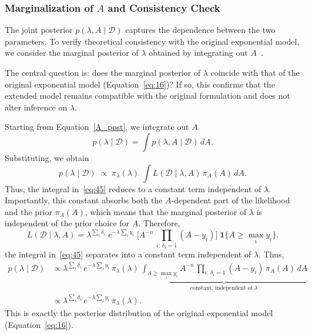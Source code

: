 \subsubsection{Marginalization of \texorpdfstring{$A$}{A} and Consistency Check}
\label{边际化章节}
The joint posterior $p(\lambda, A \mid \mathcal D)$ captures the dependence between the two parameters. To verify theoretical consistency with the original exponential model, we consider the marginal posterior of $\lambda$ obtained by integrating out $A$~\cite{gelman1995bayesian}.   

The central question is: does the marginal posterior of $\lambda$ coincide with that of the original exponential model (Equation~\ref{eq:16})? If so, this confirms that the extended model remains compatible with the original formulation and does not alter inference on $\lambda$.

Starting from Equation~\eqref{A_post}, we integrate out $A$~\cite{berger1999integrated}
\begin{equation}
    p(\lambda \mid \mathcal D)
= \int p(\lambda, A \mid \mathcal D)\,dA.
\end{equation}
Substituting, we obtain
\begin{equation}
    p(\lambda \mid \mathcal D)\;\propto\;\pi_\lambda(\lambda)\;\int L(\mathcal D \mid \lambda, A)\,\pi_A(A)\,dA.
    \label{eq:45}
\end{equation}
Thus, the integral in~\eqref{eq:45} reduces to a constant term independent of $\lambda$. 
Importantly, this constant absorbs both the $A$-dependent part of the likelihood and the prior $\pi_A(A)$, which means that the marginal posterior of $\lambda$ is independent of the prior choice for $A$. 
Therefore,
\begin{equation}
    L(\mathcal D \mid \lambda, A)
= \lambda^{\sum_i \delta_i}\;
e^{-\lambda \sum_i y_i}\;
\Bigg[
A^{-n}\,\prod_{i:\,\delta_i=1}(A-y_i)
\Bigg]\;\mathbf 1\{A \ge \max_i y_i\}.
\end{equation}
the integral in~\eqref{eq:45} separates into a constant term independent of $\lambda$. Thus,
\begin{align}
\label{eq:47}
p(\lambda \mid \mathcal{D})
&\propto \lambda^{\sum_i \delta_i}\,
e^{-\lambda \sum_i y_i}\,
\pi_\lambda(\lambda)\,
\underbrace{\int_{A \ge \max_i y_i}
A^{-n}\,\prod_{i:\,\delta_i=1}(A-y_i)\,\pi_A(A)\,dA}_{\text{constant, independent of }\lambda} \\[2pt]
&\propto \lambda^{\sum_i \delta_i}\, e^{-\lambda \sum_i y_i}\, \pi_{\lambda}(\lambda).
\end{align}
This is exactly the posterior distribution of the original exponential model (Equation~\ref{eq:16}).  

